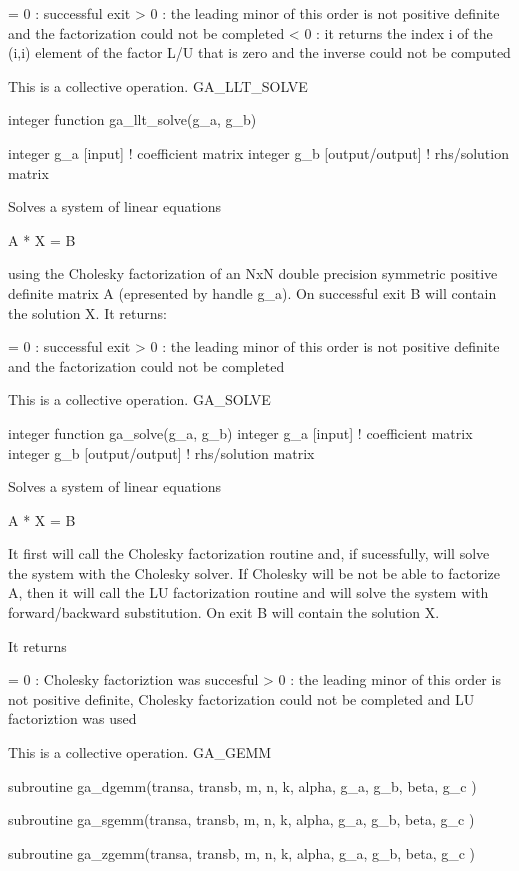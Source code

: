 = 0 : successful exit > 0 : the leading minor of this order is not
positive definite and the factorization could not be completed < 0
: it returns the index i of the (i,i) element of the factor L/U that
is zero and the inverse could not be computed

This is a collective operation. GA\_LLT\_SOLVE

integer function ga\_llt\_solve(g\_a, g\_b)

integer g\_a {[}input{]} ! coefficient matrix integer g\_b {[}output/output{]}
! rhs/solution matrix

Solves a system of linear equations

A {*} X = B

using the Cholesky factorization of an NxN double precision symmetric
positive definite matrix A (epresented by handle g\_a). On successful
exit B will contain the solution X. It returns:

= 0 : successful exit > 0 : the leading minor of this order is not
positive definite and the factorization could not be completed

This is a collective operation. GA\_SOLVE

integer function ga\_solve(g\_a, g\_b) integer g\_a {[}input{]} !
coefficient matrix integer g\_b {[}output/output{]} ! rhs/solution
matrix

Solves a system of linear equations

A {*} X = B

It first will call the Cholesky factorization routine and, if sucessfully,
will solve the system with the Cholesky solver. If Cholesky will be
not be able to factorize A, then it will call the LU factorization
routine and will solve the system with forward/backward substitution.
On exit B will contain the solution X.

It returns

= 0 : Cholesky factoriztion was succesful > 0 : the leading minor
of this order is not positive definite, Cholesky factorization could
not be completed and LU factoriztion was used

This is a collective operation. GA\_GEMM

subroutine ga\_dgemm(transa, transb, m, n, k, alpha, g\_a, g\_b, beta,
g\_c )

subroutine ga\_sgemm(transa, transb, m, n, k, alpha, g\_a, g\_b, beta,
g\_c )

subroutine ga\_zgemm(transa, transb, m, n, k, alpha, g\_a, g\_b, beta,
g\_c )

